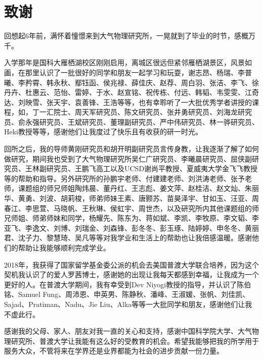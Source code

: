 \chapter[致谢]{致\quad 谢}%
\thispagestyle{noheaderstyle}%

回想起6年前，满怀着憧憬来到大气物理研究所，一晃就到了毕业的时节，感概万千。

入学那年是国科大雁栖湖校区刚刚启用，离城区很远但紧邻雁栖湖景区，风景如画，在那里认识了一批很好的同学和朋友一起学习和玩耍，谢志昂、杨瑞、李普曦、李矜霄、韩永秋、鄢钰函、侯兆禄、薛佳庆、赵荐、周白羽、张洁、李飞、徐丹卉、杜惠云、范怡、雷婷、于水、赵宣铭、祝传栋、付远、韩韬、韦雯雯、江奇达、刘映雪、张天宇、袁善锋、王浩等等，也有幸聆听了一大批优秀学者讲授的课程，如，丁一汇院士、周天军研究员、陈文研究员、张井勇研究员、刘海龙研究员、俞永强研究员、王斌研究员、董理副研究员、严中伟研究员、林一骅研究员、Heki教授等等，感谢他们让我度过了快乐且有收获的研一时光。

回所之后，我的导师黄刚研究员和胡开明副研究员言传身教，让我逐渐了解了如何做研究，期间我也受到了大气物理研究所吴仁广研究员、李曦晨研究员、屈侠副研究员、王林副研究员、王鹏飞高工以及UCSD谢尚平教授、夏威夷大学金飞飞教授等的帮助和指导。另外研究所的孙鹏宇老师、付建建老师、刘洪涛老师、张予老师，课题组的师兄师姐陶炜晨、董丹红、王志彪、姜文萍、赵桂洁、赵文灿、朱丽华、黄勇、刘波、胡莉梭，师弟师妹王素、唐颢苏、苗昊泽宇、甘如玉、汪亚、周春江、李思萱、马晓帆、王秋琳、侯虹宇、周世杰，以及研究所内其他课题组的师兄师姐、师弟师妹和同学，杨耀先、陈东为、蒋如斌、李凯、李牧原、李文韬、李亚飞、李逸文、刘博、刘瑞金、刘森锋、彭冬冬、彭玉琢、陆婷婷、申冬冬、黄丽君、沈子力、黎慧琦、吴凡等等对我学业和生活上的帮助也让我倍感温暖。感谢他们的帮助让我能够顺利完成学业。

2018年，我获得了国家留学基金委公派的机会去美国普渡大学联合培养，因为这个契机我认识了的爱人罗茜博士，感谢她的出现让我每天都感到幸福，让我成为一个更好的人。在普渡大学期间，我有幸受到Dev Niyogi教授的指导，并认识了陈伯铭、Samuel Fung、周沛恩、申英男、陈静秋、潘峰、王淑媛、张帆、刘佳凯、Sajad、Pratiman、Nadu、Jie Liu、Alka等等一大批同学和朋友，感谢他们让我不虚此行。

感谢我的父母、家人、朋友对我一直的关心和支持，感谢中国科学院大学、大气物理研究所、普渡大学让我能有这么好的受教育的机会。希望我能够把我的所学用于服务大众，不管将来在学界还是业界都能为社会的进步贡献一份力量。


\cleardoublepage[plain]%
